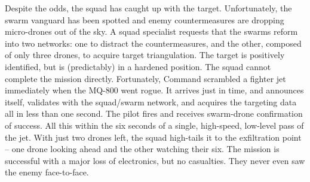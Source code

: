 %
%
%

Despite the odds, the squad has caught up with the target.
Unfortunately, the swarm vanguard has been spotted and enemy countermeasures are dropping micro-drones out of the sky.
A squad specialist requests that the swarms reform into two networks: one to distract the countermeasures, and the other, composed of only three drones, to acquire target triangulation.
The target is positively identified, but is (predictably) in a hardened position.
The squad cannot complete the mission directly.
Fortunately, Command scrambled a fighter jet immediately when the MQ-800 went rogue.
It arrives just in time, and announces itself, validates with the squad/swarm network, and acquires the targeting data all in less than one second.
The pilot fires and receives swarm-drone confirmation of success.
All this within the six seconds of a single, high-speed, low-level pass of the jet.
With just two drones left, the squad high-tails it to the exfiltration point -- one drone looking ahead and the other watching their six.
The mission is successful with a major loss of electronics, but no casualties.
They never even saw the enemy face-to-face.
